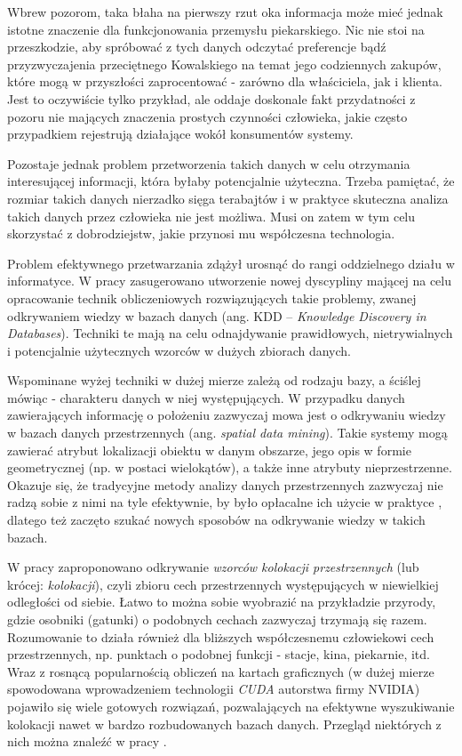 \documentclass[12pt]{article}
\begin{document}
Wbrew pozorom, taka błaha na pierwszy rzut oka informacja może mieć jednak istotne znaczenie dla funkcjonowania przemysłu piekarskiego. Nic nie stoi na przeszkodzie, aby spróbować z tych danych odczytać preferencje bądź przyzwyczajenia przeciętnego Kowalskiego na temat jego codziennych zakupów, które mogą w przyszłości zaprocentować - zarówno dla właściciela, jak i klienta. Jest to oczywiście tylko przykład, ale oddaje doskonale fakt przydatności z pozoru nie mających znaczenia prostych czynności człowieka, jakie często przypadkiem rejestrują działające wokół konsumentów systemy.

Pozostaje jednak problem przetworzenia takich danych w celu otrzymania interesującej informacji, która byłaby potencjalnie użyteczna. Trzeba pamiętać, że rozmiar takich danych nierzadko sięga terabajtów i w praktyce skuteczna analiza takich danych przez człowieka nie jest możliwa. Musi on zatem w tym celu skorzystać z dobrodziejstw, jakie przynosi mu współczesna technologia.

Problem efektywnego przetwarzania zdążył urosnąć do rangi oddzielnego działu w informatyce. W pracy \cite{kdd} zasugerowano utworzenie nowej dyscypliny mającej na celu opracowanie technik obliczeniowych rozwiązujących takie problemy, zwanej odkrywaniem wiedzy w bazach danych (ang. KDD – \textit{Knowledge Discovery in Databases}). Techniki te mają na celu odnajdywanie prawidłowych,  nietrywialnych i potencjalnie użytecznych wzorców w dużych zbiorach danych.

Wspominane wyżej techniki w dużej mierze zależą od rodzaju bazy, a ściślej mówiąc - charakteru danych w niej występujących. W przypadku danych zawierających informację o położeniu zazwyczaj mowa jest o  odkrywaniu wiedzy w bazach danych przestrzennych (ang. \textit{spatial data mining}). Takie systemy mogą zawierać atrybut lokalizacji obiektu w danym obszarze, jego opis w formie geometrycznej (np. w postaci wielokątów), a także inne atrybuty nieprzestrzenne. Okazuje się, że tradycyjne metody analizy danych przestrzennych zazwyczaj nie radzą sobie z nimi na tyle efektywnie, by było opłacalne ich użycie w praktyce \cite{trad}, dlatego też zaczęto szukać nowych sposobów na odkrywanie wiedzy w takich bazach.

W pracy \cite{huang} zaproponowano odkrywanie \textit{wzorców kolokacji przestrzennych} (lub krócej: \textit{kolokacji}), czyli zbioru cech przestrzennych występujących w niewielkiej odległości od siebie.  Łatwo to można sobie wyobrazić na przykładzie przyrody, gdzie osobniki (gatunki) o podobnych cechach zazwyczaj trzymają się razem. Rozumowanie to działa również dla bliższych współczesnemu człowiekowi cech przestrzennych, np. punktach o podobnej funkcji - stacje, kina, piekarnie, itd. Wraz z rosnącą popularnością obliczeń na kartach graficznych (w dużej mierze spowodowana wprowadzeniem technologii \textit{CUDA} autorstwa firmy NVIDIA) pojawiło się wiele gotowych rozwiązań, pozwalających na efektywne wyszukiwanie kolokacji nawet w bardzo rozbudowanych bazach danych. Przegląd niektórych z nich można znaleźć w pracy \cite{boinski}.
\end{document}
